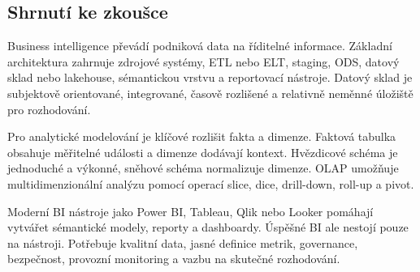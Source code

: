 \subsection{Shrnutí ke zkoušce}
Business intelligence převádí podniková data na říditelné informace. Základní architektura zahrnuje zdrojové systémy, ETL nebo ELT, staging, ODS, datový sklad nebo lakehouse, sémantickou vrstvu a reportovací nástroje. Datový sklad je subjektově orientované, integrované, časově rozlišené a relativně neměnné úložiště pro rozhodování.

Pro analytické modelování je klíčové rozlišit fakta a dimenze. Faktová tabulka obsahuje měřitelné události a dimenze dodávají kontext. Hvězdicové schéma je jednoduché a výkonné, sněhové schéma normalizuje dimenze. OLAP umožňuje multidimenzionální analýzu pomocí operací slice, dice, drill-down, roll-up a pivot.

Moderní BI nástroje jako Power BI, Tableau, Qlik nebo Looker pomáhají vytvářet sémantické modely, reporty a dashboardy. Úspěšné BI ale nestojí pouze na nástroji. Potřebuje kvalitní data, jasné definice metrik, governance, bezpečnost, provozní monitoring a vazbu na skutečné rozhodování.

